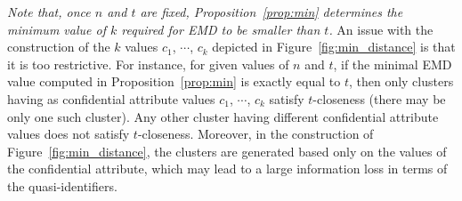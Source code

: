 \documentclass[10pt,journal,compsoc]{IEEEtran}
\theoremstyle{definition}
\theoremstyle{plain}
\begin{document}
{\em Note that, once $n$ and $t$ are fixed, Proposition~\ref{prop:min} 
determines the minimum value of $k$ required
for EMD to be smaller than $t$.} An issue with the construction of 
the $k$ values $c_1$, $\cdots$, $c_k$ 
depicted in Figure~\ref{fig:min_distance}
is that it is too restrictive. For instance, for given values of $n$
and $t$, if the minimal EMD value computed in Proposition~\ref{prop:min}
is exactly equal to $t$, 
then only clusters having as confidential attribute values 
$c_1$, $\cdots$, $c_k$ satisfy $t$-closeness (there may be 
only one such cluster).  
Any other cluster having different confidential attribute
values does not satisfy $t$-closeness. 
Moreover, in the construction of Figure~\ref{fig:min_distance},
the clusters are generated based only on the values of the confidential
attribute, which may lead to a large information loss in
terms of the quasi-identifiers. 
\end{document}
